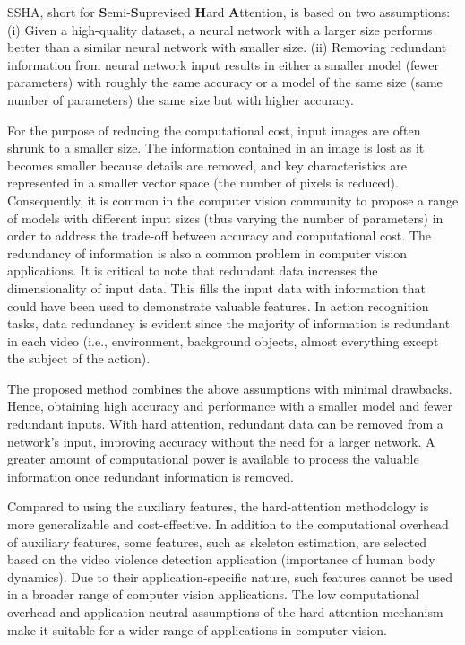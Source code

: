 \documentclass[review]{elsarticle}
\begin{document}
SSHA, short for \textbf{S}emi-\textbf{S}uprevised \textbf{H}ard \textbf{A}ttention, is based on two assumptions: (i) Given a high-quality dataset, a neural network with a larger size performs better than a similar neural network with smaller size. (ii) Removing redundant information from neural network input results in either a smaller model (fewer parameters) with roughly the same accuracy or a model of the same size (same number of parameters) the same size but with higher accuracy.

For the purpose of reducing the computational cost, input images are often shrunk to a smaller size. The information contained in an image is lost as it becomes smaller because details are removed, and key characteristics are represented in a smaller vector space (the number of pixels is reduced). Consequently, it is common in the computer vision community to propose a range of models with different input sizes (thus varying the number of parameters) in order to address the trade-off between accuracy and computational cost. The redundancy of information is also a common problem in computer vision applications. It is critical to note that redundant data increases the dimensionality of input data. This fills the input data with information that could have been used to demonstrate valuable features. In action recognition tasks, data redundancy is evident since the majority of information is redundant in each video (i.e., environment, background objects, almost everything except the subject of the action).

The proposed method combines the above assumptions with minimal drawbacks. Hence, obtaining high accuracy and performance with a smaller model and fewer redundant inputs. With hard attention, redundant data can be removed from a network's input, improving accuracy without the need for a larger network. A greater amount of computational power is available to process the valuable information once redundant information is removed.

{Compared to using the auxiliary features, the hard-attention methodology is more generalizable and cost-effective. In addition to the computational overhead of auxiliary features, some features, such as skeleton estimation, are selected based on the video violence detection application (importance of human body dynamics). Due to their application-specific nature, such features cannot be used in a broader range of computer vision applications. The low computational overhead and application-neutral assumptions of the hard attention mechanism make it suitable for a wider range of applications in computer vision.}
\end{document}
